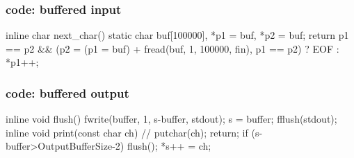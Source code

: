 \begin{frame}[fragile]
    \frametitle{code: buffered input}
    \begin{cppcode}
    inline char next_char()
    {
        static char buf[100000], *p1 = buf,
            *p2 = buf;
        return p1 == p2 && (p2 = (p1 = buf)
            + fread(buf, 1, 100000, fin), p1 == p2) 
            ? EOF : *p1++;
    }
    \end{cppcode}
\end{frame}


\begin{frame}[fragile]
    \frametitle{code: buffered output}
    \begin{cppcode}
    inline void flush() {
        fwrite(buffer, 1, s-buffer, stdout);
        s = buffer;
        fflush(stdout);
    }
    inline void print(const char ch) {
        // putchar(ch); return;
        if (s-buffer>OutputBufferSize-2) flush();
        *s++ = ch;
    }
    \end{cppcode}
\end{frame}

